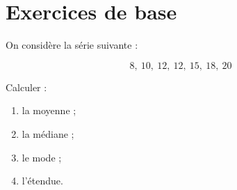 \section{Exercices de base}

\begin{cadreenonce}
On considère la série suivante :

\[
8,\ 10,\ 12,\ 12,\ 15,\ 18,\ 20
\]

Calculer :
\begin{enumerate}
    \item la moyenne ;
    \item la médiane ;
    \item le mode ;
    \item l’étendue.
\end{enumerate}
\end{cadreenonce}